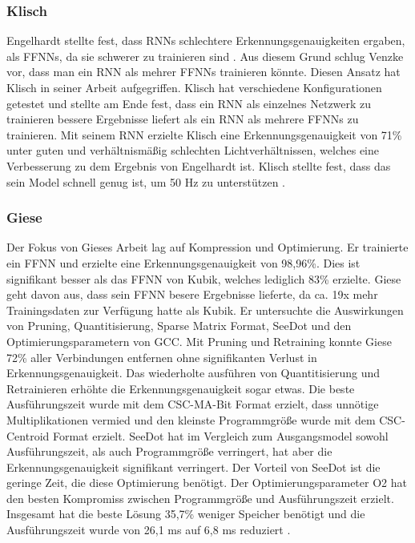 \subsubsection{Klisch}
Engelhardt stellte fest, dass RNNs schlechtere Erkennungsgenauigkeiten ergaben, als FFNNs, da sie schwerer zu trainieren sind \cite{engelhardtThesis}.
Aus diesem Grund schlug Venzke vor, dass man ein RNN als mehrer FFNNs trainieren könnte. Diesen Ansatz hat Klisch in seiner Arbeit aufgegriffen. Klisch hat verschiedene Konfigurationen getestet und stellte am Ende fest,
dass ein RNN als einzelnes Netzwerk zu trainieren bessere Ergebnisse liefert als ein RNN als mehrere FFNNs zu trainieren. Mit seinem RNN erzielte Klisch eine Erkennungsgenauigkeit von 71\% unter guten und verhältnismäßig
schlechten Lichtverhältnissen, welches eine Verbesserung zu dem Ergebnis von Engelhardt ist. Klisch stellte fest, dass das sein Model schnell genug ist, um 50 Hz zu unterstützen \cite{klischThesis}.
\subsubsection{Giese}
Der Fokus von Gieses Arbeit lag auf Kompression und Optimierung. Er trainierte ein FFNN und erzielte eine Erkennungsgenauigkeit von 98,96\%. Dies ist signifikant besser als das FFNN von Kubik, welches lediglich 83\% erzielte.
Giese geht davon aus, dass sein FFNN besere Ergebnisse lieferte, da ca. 19x mehr Trainingsdaten zur Verfügung hatte als Kubik. Er untersuchte die Auswirkungen von Pruning, Quantitisierung, Sparse Matrix Format, SeeDot und
den Optimierungsparametern von GCC. Mit Pruning und Retraining konnte Giese 72\% aller Verbindungen entfernen ohne signifikanten Verlust in Erkennungsgenauigkeit. Das wiederholte ausführen von Quantitisierung und
Retrainieren erhöhte die Erkennungsgenauigkeit sogar etwas. Die beste Ausführungszeit wurde mit dem CSC-MA-Bit Format erzielt, dass unnötige Multiplikationen vermied und den kleinste Programmgröße wurde mit dem
CSC-Centroid Format erzielt. SeeDot hat im Vergleich zum Ausgangsmodel sowohl Ausführungszeit, als auch Programmgröße verringert, hat aber die Erkennungsgenauigkeit signifikant verringert. Der Vorteil von SeeDot
ist die geringe Zeit, die diese Optimierung benötigt. Der Optimierungsparameter O2 hat den besten Kompromiss zwischen Programmgröße und Ausführungszeit erzielt. Insgesamt hat die beste Lösung 35,7\% weniger Speicher
benötigt und die Ausführungszeit wurde von 26,1 ms auf 6,8 ms reduziert \cite{gieseThesis}.